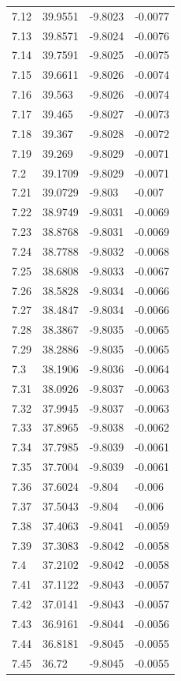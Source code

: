 \begin{tabular}{llll}
7.12 & 39.9551 & -9.8023 & -0.0077 \\
7.13 & 39.8571 & -9.8024 & -0.0076 \\
7.14 & 39.7591 & -9.8025 & -0.0075 \\
7.15 & 39.6611 & -9.8026 & -0.0074 \\
7.16 & 39.563 & -9.8026 & -0.0074 \\
7.17 & 39.465 & -9.8027 & -0.0073 \\
7.18 & 39.367 & -9.8028 & -0.0072 \\
7.19 & 39.269 & -9.8029 & -0.0071 \\
7.2 & 39.1709 & -9.8029 & -0.0071 \\
7.21 & 39.0729 & -9.803 & -0.007 \\
7.22 & 38.9749 & -9.8031 & -0.0069 \\
7.23 & 38.8768 & -9.8031 & -0.0069 \\
7.24 & 38.7788 & -9.8032 & -0.0068 \\
7.25 & 38.6808 & -9.8033 & -0.0067 \\
7.26 & 38.5828 & -9.8034 & -0.0066 \\
7.27 & 38.4847 & -9.8034 & -0.0066 \\
7.28 & 38.3867 & -9.8035 & -0.0065 \\
7.29 & 38.2886 & -9.8035 & -0.0065 \\
7.3 & 38.1906 & -9.8036 & -0.0064 \\
7.31 & 38.0926 & -9.8037 & -0.0063 \\
7.32 & 37.9945 & -9.8037 & -0.0063 \\
7.33 & 37.8965 & -9.8038 & -0.0062 \\
7.34 & 37.7985 & -9.8039 & -0.0061 \\
7.35 & 37.7004 & -9.8039 & -0.0061 \\
7.36 & 37.6024 & -9.804 & -0.006 \\
7.37 & 37.5043 & -9.804 & -0.006 \\
7.38 & 37.4063 & -9.8041 & -0.0059 \\
7.39 & 37.3083 & -9.8042 & -0.0058 \\
7.4 & 37.2102 & -9.8042 & -0.0058 \\
7.41 & 37.1122 & -9.8043 & -0.0057 \\
7.42 & 37.0141 & -9.8043 & -0.0057 \\
7.43 & 36.9161 & -9.8044 & -0.0056 \\
7.44 & 36.8181 & -9.8045 & -0.0055 \\
7.45 & 36.72 & -9.8045 & -0.0055 \\

\end{tabular}
